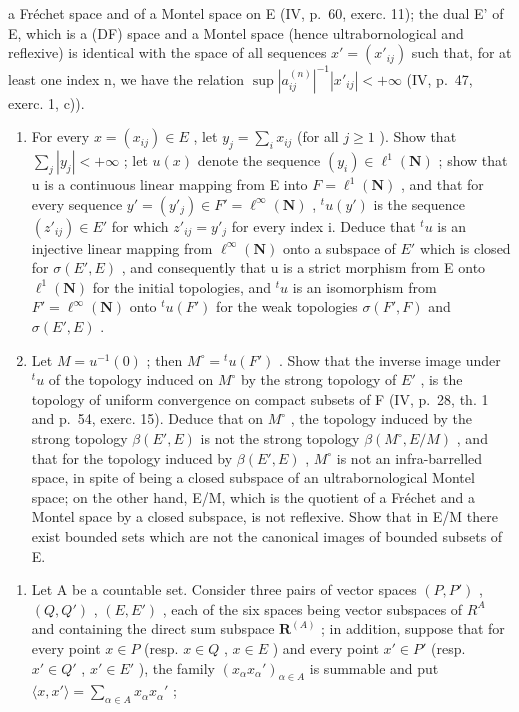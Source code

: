a Fréchet space and of a Montel space on E (IV, p.~60, exerc. 11); the dual E' of E, which is a (DF) space and a Montel space (hence ultrabornological and reflexive) is identical with the space of all sequences \(x' = (x'_{ij})\) such that, for at least one index n, we have the relation \(\sup |a_{ij}^{(n)}|^{-1} |x'_{ij}| < +\infty\) (IV, p.~47, exerc. 1, c)).

\begin{enumerate}
\def\labelenumi{\alph{enumi})}
\item
  For every \(x = (x_{ij}) \in E\) , let \(y_j = \sum_i x_{ij}\) (for all \(j \geqslant 1\) ). Show that \(\sum_j |y_j| < +\infty\) ; let \(u(x)\) denote the sequence \((y_i) \in \ell^1(\mathbf{N})\) ; show that u is a continuous linear mapping from E into \(F = \ell^1(\mathbf{N})\) , and that for every sequence \(y' = (y'_j) \in F' = \ell^\infty(\mathbf{N})\) , \(^t u(y')\) is the sequence \((z'_{ij}) \in E'\) for which \(z'_{ij} = y'_j\) for every index i. Deduce that \(^t u\) is an injective linear mapping from \(\ell^\infty(\mathbf{N})\) onto a subspace of \(E'\) which is closed for \(\sigma(E', E)\) , and consequently that u is a strict morphism from E onto \(\ell^1(\mathbf{N})\) for the initial topologies, and \(^t u\) is an isomorphism from \(F' = \ell^\infty(\mathbf{N})\) onto \(^t u(F')\) for the weak topologies \(\sigma(F', F)\) and \(\sigma(E', E)\) .
\item
  Let \(M = u^{-1}(0)\) ; then \(M^{\circ} = {}^{t}u(F')\) . Show that the inverse image under \({}^{t}u\) of the topology induced on \(M^{\circ}\) by the strong topology of \(E'\) , is the topology of uniform convergence on compact subsets of F (IV, p.~28, th. 1 and p.~54, exerc. 15). Deduce that on \(M^{\circ}\) , the topology induced by the strong topology \(\beta(E', E)\) is not the strong topology \(\beta(M^{\circ}, E/M)\) , and that for the topology induced by \(\beta(E', E)\) , \(M^{\circ}\) is not an infra-barrelled space, in spite of being a closed subspace of an ultrabornological Montel space; on the other hand, E/M, which is the quotient of a Fréchet and a Montel space by a closed subspace, is not reflexive. Show that in E/M there exist bounded sets which are not the canonical images of bounded subsets of E.
\end{enumerate}

\begin{enumerate}
\def\labelenumi{\arabic{enumi})}
\setcounter{enumi}{8}
\tightlist
\item
  Let A be a countable set. Consider three pairs of vector spaces \((P, P')\) , \((Q, Q')\) , \((E, E')\) , each of the six spaces being vector subspaces of \(R^{A}\) and containing the direct sum subspace \(\mathbf{R}^{(A)}\) ; in addition, suppose that for every point \(x \in P\) (resp. \(x \in Q\) , \(x \in E\) ) and every point \(x' \in P'\) (resp. \(x' \in Q'\) , \(x' \in E'\) ), the family \((x_{\alpha}x_{\alpha}')_{\alpha \in A}\) is summable and put \(\langle x, x' \rangle = \sum_{\alpha \in A} x_{\alpha}x_{\alpha}'\) ;
\end{enumerate}

